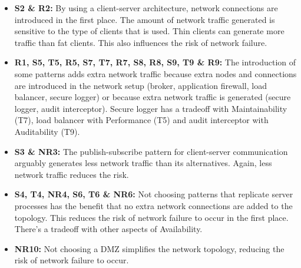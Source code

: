 \documentclass[a4paper,11pt]{report}
\begin{document}
\begin{itemize}
\item \textbf{S2 \& R2:} By using a client-server architecture, network connections are introduced in the first place. The amount of network traffic generated is sensitive to the type of clients that is used. Thin clients can generate more traffic than fat clients. This also influences the risk of network failure.
\item \textbf{R1, S5, T5, R5, S7, T7, R7, S8, R8, S9, T9 \& R9:} The introduction of some patterns adds extra network traffic because extra nodes and connections are introduced in the network setup (broker, application firewall, load balancer, secure logger) or because extra network traffic is generated (secure logger, audit interceptor). Secure logger has a tradeoff with Maintainability (T7), load balancer with Performance (T5) and audit interceptor with Auditability (T9).
\item \textbf{S3 \& NR3:} The publish-subscribe pattern for client-server communication arguably generates less network traffic than its alternatives. Again, less network traffic reduces the risk.
\item \textbf{S4, T4, NR4, S6, T6 \& NR6: } Not choosing patterns that replicate server processes has the benefit that no extra network connections are added to the topology. This reduces the risk of network failure to occur in the first place. There's a tradeoff with other aspects of Availability.
\item \textbf{NR10:} Not choosing a DMZ simplifies the network topology, reducing the risk of network failure to occur.
\end{itemize}
\end{document}
